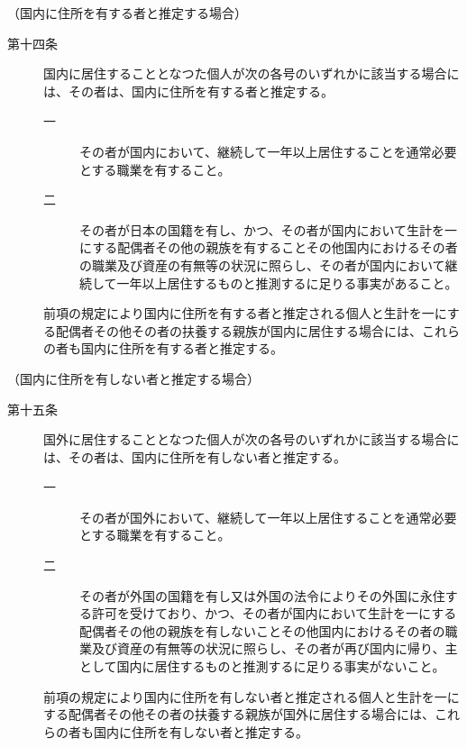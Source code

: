 \documentclass[twocolumn,a4j,10pt]{ltjtarticle}
\begin{document}
\noindent\hspace{10pt}（国内に住所を有する者と推定する場合）
\begin{description}
\item[第十四条]国内に居住することとなつた個人が次の各号のいずれかに該当する場合には、その者は、国内に住所を有する者と推定する。
\begin{description}
\item[一]その者が国内において、継続して一年以上居住することを通常必要とする職業を有すること。
\item[二]その者が日本の国籍を有し、かつ、その者が国内において生計を一にする配偶者その他の親族を有することその他国内におけるその者の職業及び資産の有無等の状況に照らし、その者が国内において継続して一年以上居住するものと推測するに足りる事実があること。
\end{description}
\item[]前項の規定により国内に住所を有する者と推定される個人と生計を一にする配偶者その他その者の扶養する親族が国内に居住する場合には、これらの者も国内に住所を有する者と推定する。
\end{description}
\noindent\hspace{10pt}（国内に住所を有しない者と推定する場合）
\begin{description}
\item[第十五条]国外に居住することとなつた個人が次の各号のいずれかに該当する場合には、その者は、国内に住所を有しない者と推定する。
\begin{description}
\item[一]その者が国外において、継続して一年以上居住することを通常必要とする職業を有すること。
\item[二]その者が外国の国籍を有し又は外国の法令によりその外国に永住する許可を受けており、かつ、その者が国内において生計を一にする配偶者その他の親族を有しないことその他国内におけるその者の職業及び資産の有無等の状況に照らし、その者が再び国内に帰り、主として国内に居住するものと推測するに足りる事実がないこと。
\end{description}
\item[]前項の規定により国内に住所を有しない者と推定される個人と生計を一にする配偶者その他その者の扶養する親族が国外に居住する場合には、これらの者も国内に住所を有しない者と推定する。
\end{description}
\end{document}
